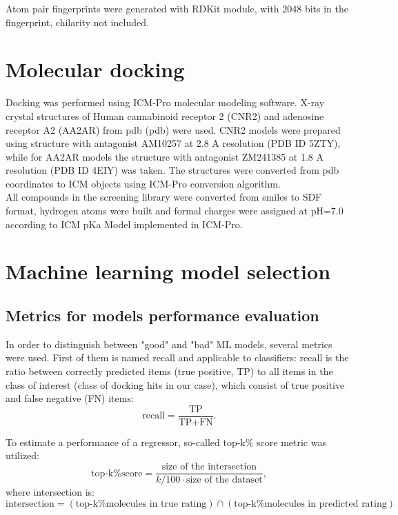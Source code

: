 Atom pair fingerprints were generated with RDKit module, with 2048 bits in the fingerprint, 
chilarity not included.

\section{Molecular docking}
Docking was performed using ICM-Pro molecular modeling software.
X-ray crystal structures of Human cannabinoid receptor 2 (CNR2) and adenosine receptor 
A2 (AA2AR) from \acrlong{pdb} (\acrshort{pdb}) were used.
CNR2 models were prepared using structure with antagonist AM10257 at 2.8 A resolution 
(PDB ID 5ZTY), while for AA2AR models the structure with antagonist ZM241385 at 
1.8 A resolution (PDB ID 4EIY) was taken.
The structures were converted from \acrshort{pdb} coordinates to ICM objects using 
ICM-Pro conversion algorithm.\\

All compounds in the screening library were converted from \acrshort{smiles} to 
SDF format, hydrogen atoms were built and formal charges were assigned at pH=7.0 
according to ICM pKa Model implemented in ICM-Pro.

\section{Machine learning model selection}

\subsection{Metrics for models performance evaluation}
In order to distinguish between "good" and "bad" ML models, several metrics were 
used.
First of them is named recall and applicable to classifiers: recall is the ratio 
between correctly predicted items (true positive, TP) to all items in the class 
of interest (class of docking hits in our case), which consist of true positive 
and false negative (FN) items:
\begin{equation*}
    \text{recall} = \frac{\text{TP}}{\text{TP} + \text{FN}}.
\end{equation*}

To estimate a performance of a regressor, so-called top-k\% score metric was utilized:
\begin{equation*}
\text{top-k\% score} = \frac{\text{size of the intersection}}{k/100 \cdot \text{size of the dataset}},
\end{equation*}
where intersection is:
\begin{equation*}
         \text{intersection} = \left( \text{top-k\% molecules in true rating}\right) \cap \left( \text{top-k\% molecules in predicted rating}\right)
\end{equation*}


